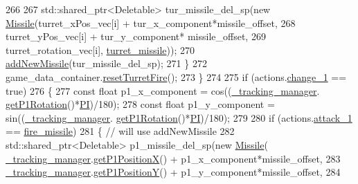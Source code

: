 \begin{DoxyCode}
266 
267             std::shared\_ptr<Deletable> tur\_missile\_del\_sp(\textcolor{keyword}{new} \hyperlink{classMissile}{Missile}(turret\_xPos\_vec[i] + 
      tur\_x\_component*missile\_offset,
268                                                                     turret\_yPos\_vec[i] + tur\_y\_component*
      missile\_offset,
269                                                                     turret\_rotation\_vec[i], 
      \hyperlink{Structures_8h_a6d8f83e710b27d4f86c45f0bb77066e3a8f552a1e495ced5aa8775faa1b6a757b}{turret\_missile}));
270             \hyperlink{classGame_a2099d667dbb4574c4c9bed31eab2abb2}{addNewMissile}(tur\_missile\_del\_sp);
271         \}
272         game\_data\_container.\hyperlink{classGameManagementData_a2e9acf1ddddabee775dc106b478aa2e2}{resetTurretFire}();
273     \}
274 
275     \textcolor{keywordflow}{if} (actions.\hyperlink{structactions__info_a69ac673533838f973f09492a12516816}{change\_1} == \textcolor{keyword}{true})
276     \{
277         \textcolor{keyword}{const} \textcolor{keywordtype}{float} p1\_x\_component = cos((\hyperlink{classGame_af8fcc8c3d82a46d37e354de8ddde88c0}{\_tracking\_manager}.
      \hyperlink{classTrackingManager_aad99796d4377109c93177204db15d1a8}{getP1Rotation}()*\hyperlink{ClassTests_8cpp_a598a3330b3c21701223ee0ca14316eca}{PI})/180);
278         \textcolor{keyword}{const} \textcolor{keywordtype}{float} p1\_y\_component = sin((\hyperlink{classGame_af8fcc8c3d82a46d37e354de8ddde88c0}{\_tracking\_manager}.
      \hyperlink{classTrackingManager_aad99796d4377109c93177204db15d1a8}{getP1Rotation}()*\hyperlink{ClassTests_8cpp_a598a3330b3c21701223ee0ca14316eca}{PI})/180);
279 
280         \textcolor{keywordflow}{if} (actions.\hyperlink{structactions__info_a722a3805cc06ba6e5f9627b942f9bbf2}{attack\_1} == \hyperlink{Structures_8h_abf3d9daa4559fb2f9e16fc1836fead1badfc8afb4acc9eae75dcfdde515861288}{fire\_missile})
281         \{   \textcolor{comment}{// will use addNewMissile}
282             std::shared\_ptr<Deletable> p1\_missile\_del\_sp(\textcolor{keyword}{new} \hyperlink{classMissile}{Missile}(
      \hyperlink{classGame_af8fcc8c3d82a46d37e354de8ddde88c0}{\_tracking\_manager}.\hyperlink{classTrackingManager_ab455df1659739739b2be5f42f08e4b26}{getP1PositionX}() + p1\_x\_component*missile\_offset,
283                                                                     
      \hyperlink{classGame_af8fcc8c3d82a46d37e354de8ddde88c0}{\_tracking\_manager}.\hyperlink{classTrackingManager_ab79ae59918b07ad546cd7d95cfc983f6}{getP1PositionY}() + p1\_y\_component*missile\_offset,
284                                                                     

\end{DoxyCode}
